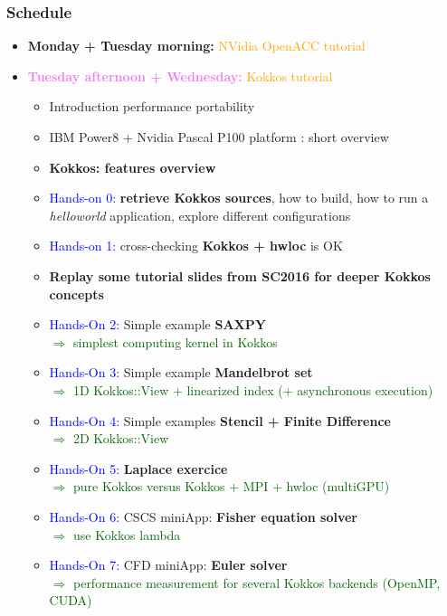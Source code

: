 \begin{frame}
  \frametitle{Schedule}

  \begin{itemize}
  \item {\bf Monday + Tuesday morning:} \textcolor{orange}{NVidia OpenACC tutorial}
  \item {\bf \textcolor{violet}{Tuesday afternoon + Wednesday:}} \textcolor{orange}{Kokkos tutorial}
    \begin{itemize}
    \item Introduction performance portability
    \item IBM Power8 + Nvidia Pascal P100 platform : short overview
    \item \textbf{Kokkos: features overview}
    \item \textcolor{blue}{Hands-on 0:} \textbf{retrieve Kokkos sources}, how to build, how to run a \textit{helloworld} application, explore different configurations
    \item \textcolor{blue}{Hands-on 1:} cross-checking \textbf{Kokkos + hwloc} is OK
    \item \textbf{Replay some tutorial slides from SC2016 for deeper Kokkos concepts}
    \item \textcolor{blue}{Hands-On 2:} Simple example \textbf{SAXPY}\\
      \textcolor{darkgreen}{$\Rightarrow$ simplest computing kernel in Kokkos}
    \item \textcolor{blue}{Hands-On 3:} Simple example \textbf{Mandelbrot set}\\
      \textcolor{darkgreen}{$\Rightarrow$ 1D Kokkos::View + linearized index (+ asynchronous execution)}
    \item \textcolor{blue}{Hands-On 4:} Simple examples \textbf{Stencil + Finite Difference}\\
      \textcolor{darkgreen}{$\Rightarrow$ 2D Kokkos::View}
    \item \textcolor{blue}{Hands-On 5:} \textbf{Laplace exercice}\\
      \textcolor{darkgreen}{$\Rightarrow$ pure Kokkos versus Kokkos + MPI + hwloc (multiGPU)}
    \item \textcolor{blue}{Hands-On 6:} CSCS miniApp: \textbf{Fisher equation solver}\\
      \textcolor{darkgreen}{$\Rightarrow$ use Kokkos lambda}
    \item \textcolor{blue}{Hands-On 7:} CFD miniApp: \textbf{Euler solver}\\
      \textcolor{darkgreen}{$\Rightarrow$ performance measurement for several Kokkos backends (OpenMP, CUDA)}
    \end{itemize}
  \end{itemize}

\end{frame}

